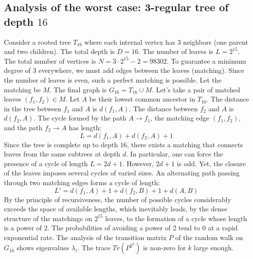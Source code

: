 \documentclass[12pt,a4paper]{article}
\begin{document}
\subsection{Analysis of the worst case: 3-regular tree of depth $16$}
Consider a rooted tree $T_{16}$ where each internal vertex has 3 neighbors (one parent and two children).
The total depth is $D = 16$.
The number of leaves is $L = 2^{15}$.
The total number of vertices is $N = 3 \cdot 2^{15} - 2 = 98302$.
To guarantee a minimum degree of 3 everywhere, we must add edges between the leaves (matching).
Since the number of leaves is even, such a perfect matching is possible.
Let the matching be $M$. The final graph is $G_{16} = T_{16} \cup M$.
Let's take a pair of matched leaves $(f_1, f_2) \in M$.
Let $A$ be their lowest common ancestor in $T_{16}$.
The distance in the tree between $f_1$ and $A$ is $d(f_1, A)$.
The distance between $f_2$ and $A$ is $d(f_2, A)$.
The cycle formed by the path $A \to f_1$, the matching edge $(f_1, f_2)$, and the path $f_2 \to A$ has length:
$$ L = d(f_1, A) + d(f_2, A) + 1 $$
Since the tree is complete up to depth $16$, there exists a matching that connects leaves from the same subtrees at depth $d$.
In particular, one can force the presence of a cycle of length $L = 2d + 1$. However, $2d+1$ is odd.
Yet, the closure of the leaves imposes several cycles of varied sizes. An alternating path passing through two matching edges forms a cycle of length:
$$ L' = d(f_1, A) + 1 + d(f_2, B) + 1 + d(A, B) $$
By the principle of recursiveness, the number of possible cycles considerably exceeds the space of available lengths, which inevitably leads, by the dense structure of the matchings on $2^{15}$ leaves, to the formation of a cycle whose length is a power of 2. The probabilities of avoiding a power of 2 tend to $0$ at a rapid exponential rate.
The analysis of the transition matrix $P$ of the random walk on $G_{16}$ shows eigenvalues $\lambda_i$. The trace $Tr(P^{2^k})$ is non-zero for $k$ large enough.
\end{document}
